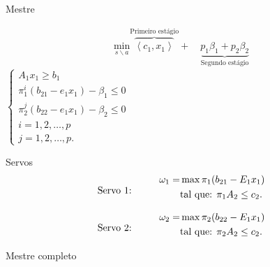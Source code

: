 \documentclass[12pt]{beamer}
\begin{document}
\begin{frame}{Mestre}
	\begin{justify}	
		\begin{align*}
		 \underset {s \backslash a}{\text{min}} \overbrace{\left < c_1,x_1\right >}^{\textrm{Primeiro estágio}} 
		 +\quad \underbrace {p_1 {\beta}_{1} + p_2 {\beta}_{2}}_{\textrm{Segundo estágio}}
		\end{align*}
		$\left \{ 
	 \begin{aligned}
		 A_1 x_1 \geq b_1 \\
		{\pi}_{1}^{i}(b_{21} - e_1x_1) - {\beta}_{1} \leq 0 \\ 
		{\pi}_{2}^{j}(b_{22} - e_1x_1) - {\beta}_{2} \leq 0 \\ 
		i = 1, 2, \dots , p \\
		j = 1, 2, \dots , p. 
	 \end{aligned}
	\right . 
	$
	\end{justify}
\end{frame}

\begin{frame}{Servos}
	\begin{align*}
		\txt{Servo 1:} \hspace{1cm}
	  \begin{split}	
		  \omega_1 = &\max \pi_1 (b_{21} - E_1x_1 ) \\
		&\mbox{tal que: }\pi_1 A_2  \leq c_2.
	  \end{split}
	\end{align*}

		\begin{align*}
			\txt{Servo 2:} \hspace{1cm}
	  \begin{split}	
		  \omega_2 = &\max \pi_2 (b_{22} - E_1x_1 ) \\
		&\mbox{tal que: }\pi_2 A_2  \leq c_2.
	  \end{split}
	\end{align*}
	\end{frame}

	\begin{frame}{Mestre completo}
\end{frame}
\end{document}
